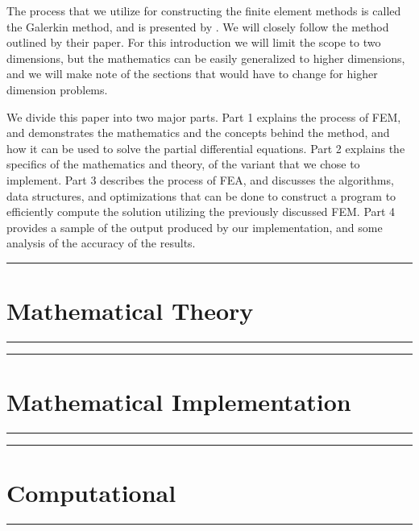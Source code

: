 \documentclass[10pt]{armath}
\numberwithin{equation}{section}
\theoremstyle{definition}
\newcommand{\hdiv}[3]{
  \vspace{#1}%
  \noindent\rule{\textwidth}{#2}%
  \vspace{#3}%
}
\begin{document}
The process that we utilize for constructing the finite element methods is
called the Galerkin method, and is presented by \cite{KH}. We will closely
follow the method outlined by their paper. For this introduction we will limit
the scope to two dimensions, but the mathematics can be easily generalized to
higher dimensions, and we will make note of the sections that would have to
change for higher dimension problems.

We divide this paper into two major parts. Part 1 explains the process of FEM,
and demonstrates the mathematics and the concepts behind the method, and how it
can be used to solve the partial differential equations. Part 2 explains the
specifics of the mathematics and theory, of the variant that we chose to
implement. Part 3 describes the process of FEA, and discusses the algorithms,
data structures, and optimizations that can be done to construct a program to
efficiently compute the solution utilizing the previously discussed FEM. Part 4
provides a sample of the output produced by our implementation, and some
analysis of the accuracy of the results.

\newpage
\hdiv{10pt}{0.5pt}{1pt}
\part{Mathematical Theory}%
\label{prt:mathematical_theory}
\hdiv{1pt}{0.5pt}{10pt}







\newpage
\hdiv{10pt}{0.5pt}{1pt}
\part{Mathematical Implementation}%
\label{prt:mathematical_implementation}
\hdiv{1pt}{0.5pt}{10pt}









\newpage
\hdiv{10pt}{0.5pt}{1pt}
\part{Computational}%
\label{prt:computational}
\hdiv{1pt}{0.5pt}{10pt}







\end{document}
